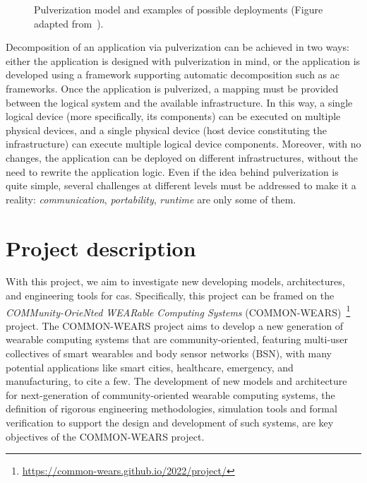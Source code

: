 \documentclass[12pt,a4paper]{article}
\begin{document}
\begin{figure}[ht]
\begin{minipage}{\columnwidth}
\begin{minipage}{0.48\columnwidth}
		\end{minipage}
	\end{minipage}

	\caption{
		Pulverization model and examples of possible deployments (Figure adapted from~\cite{DBLP:journals/fi/CasadeiPPVW20}).
	}
	\label{fig:pulv}
\end{figure}
%
Decomposition of an application via pulverization can be achieved in two ways:
either the application is designed with pulverization in mind,
or the application is developed using a framework supporting automatic decomposition such as \ac{ac} frameworks.
%
Once the application is pulverized,
a mapping must be provided between the logical system and the available infrastructure.
%
In this way,
a single logical device (more specifically, its components) can be executed on multiple physical devices,
and a single physical device (host device constituting the infrastructure) can execute multiple logical device components.
%
Moreover,
with no changes,
the application can be deployed on different infrastructures,
without the need to rewrite the application logic.
%
Even if the idea behind pulverization is quite simple,
several challenges at different levels must be addressed to make it a reality:
\emph{communication}, \emph{portability}, \emph{runtime} are only some of them.


\section{Project description}\label{sec:project-description}
With this project,
we aim to investigate new developing models,
architectures,
and engineering tools for \ac{cas}.
%
Specifically,
this project can be framed on the \emph{COMMunity-OrieNted WEARable Computing Systems} (COMMON-WEARS)~\footnote{\url{https://common-wears.github.io/2022/project/}} project.
%
The COMMON-WEARS project aims to develop a new generation of wearable computing systems that are community-oriented,
featuring multi-user collectives of smart wearables and body sensor networks (BSN),
with many potential applications like smart cities,
healthcare,
emergency,
and manufacturing, to cite a few.
%
The development of new models and architecture for next-generation of community-oriented wearable computing systems,
the definition of rigorous engineering methodologies,
simulation tools and formal verification to support the design and development of such systems,
are key objectives of the COMMON-WEARS project.
\end{document}
